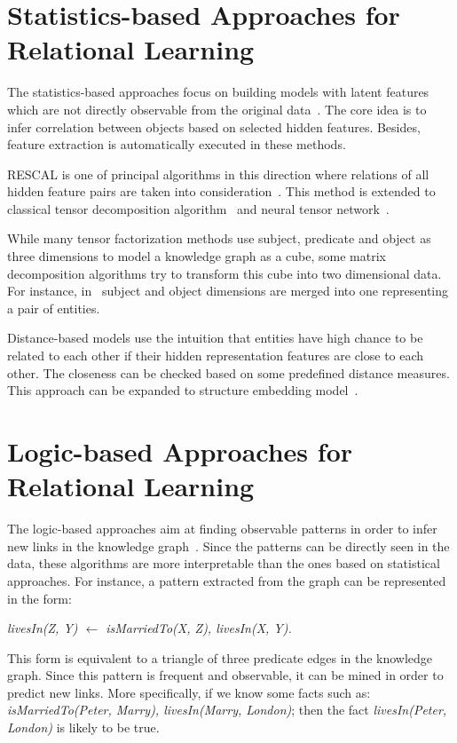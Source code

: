 \section{Statistics-based Approaches for Relational Learning}

The statistics-based approaches focus on building models with latent features which are not directly observable from the original data~\cite{ref1}. The core idea is to infer correlation between objects based on selected hidden features. Besides, feature extraction is automatically executed in these methods.

RESCAL is one of principal algorithms in this direction where relations of all hidden feature pairs are taken into consideration~\cite{ref2, ref3}. This method is extended to classical tensor decomposition algorithm~\cite{ref4} and neural tensor network~\cite{ref5}.

While many tensor factorization methods use subject, predicate and object as three dimensions to model a knowledge graph as a cube, some matrix decomposition algorithms try to transform this cube into two dimensional data. For instance, in~\cite{ref6, ref7} subject and object dimensions are merged into one representing a pair of entities.

Distance-based models use the intuition that entities have high chance to be related to each other if their hidden representation features are close to each other. The closeness can be checked based on some predefined distance measures. This approach can be expanded to structure embedding model~\cite{ref8}.

\section{Logic-based Approaches for Relational Learning}

The logic-based approaches aim at finding observable patterns in order to infer new links in the knowledge graph~\cite{ref1}. Since the patterns can be directly seen in the data, these algorithms are more interpretable than the ones based on statistical approaches. For instance, a pattern extracted from the graph can be represented in the form:\\

\centerline{\textit{livesIn(Z, Y) $\leftarrow$ isMarriedTo(X, Z), livesIn(X, Y).}}

This form is equivalent to a triangle of three predicate edges in the knowledge graph. Since this pattern is frequent and observable, it can be mined in order to predict new links. More specifically, if we know some facts such as: \textit{isMarriedTo(Peter, Marry), livesIn(Marry, London)}; then the fact \textit{livesIn(Peter, London)} is likely to be true.

